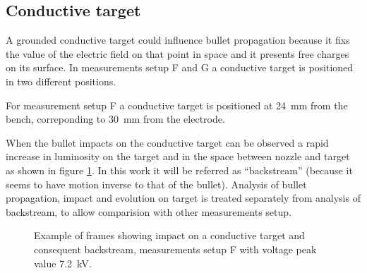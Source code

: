 \subsection{Conductive target}
A grounded conductive target could influence bullet propagation because it fixs the value of the electric field on that point in space and it presents free charges on its surface.
In measurements setup F and G a conductive target is positioned in two different positions.

For measurement setup F a conductive target is positioned at \SI{24}{\milli\meter} from the bench, correponding to \SI{30}{\milli\meter} from the electrode. 

When the bullet impacts on the conductive target can be observed a rapid increase in luminosity on the target and in the space between nozzle and target as shown in figure \ref{fig:elio_met}. In this work it will be referred as ``backstream'' (because it seems to have motion inverse to that of the bullet). Analysis of bullet propagation, impact and evolution on target is treated separately from analysis of backstream, to allow comparision with other measurements setup.
\begin{figure}
 \centering
 \hfill
 \hfill
 \caption{Example of frames showing impact on a conductive target and consequent backstream, measurements setup F with voltage peak value \SI{7.2}{\kilo\volt}.}
 \label{fig:elio_met}
\end{figure}


